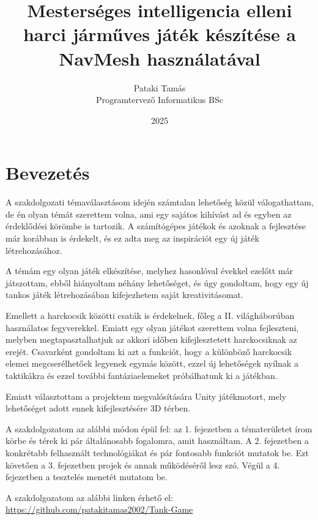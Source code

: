 \documentclass[
]{thesis-ekf}
\theoremstyle{definition}
\theoremstyle{remark}
\begin{document}
\title{Mesterséges intelligencia elleni harci járműves játék készítése a NavMesh használatával}
\author{Pataki Tamás\\Programtervező Informatikus BSc}
\date{2025}
\maketitle

\tableofcontents

\chapter*{Bevezetés}

A szakdolgozati témaválasztásom idején számtalan lehetőség közül válogathattam, de én olyan témát szerettem volna, ami egy sajátos kihívást ad és egyben az érdeklődési körömbe is tartozik. A számítógépes játékok és azoknak a fejlesztése már korábban is érdekelt, és ez adta meg az inspirációt egy új játék létrehozásához.

A témám egy olyan játék elkészítése, melyhez hasonlóval évekkel ezelőtt már játszottam, ebből hiányoltam néhány lehetőséget, és úgy gondoltam, hogy egy új tankos játék létrehozásában kifejezhetem saját kreativitásomat.

Emellett a harckocsik közötti csaták is érdekelnek, főleg a II. világháborúban használatos fegyverekkel. Emiatt egy olyan játékot szerettem volna fejleszteni, melyben megtapasztalhatjuk az akkori időben kifejlesztetett harckocsiknak az erejét. Csavarként gondoltam ki azt a funkciót, hogy a különböző harckocsik elemei megcserélhetőek legyenek egymás között, ezzel új lehetőségek nyílnak a taktikákra és ezzel további fantáziaelemeket próbálhatunk ki a játékban.

Emiatt választottam a projektem megvalósítására Unity\cite{unity} játékmotort, mely lehetőséget adott ennek kifejlesztésére 3D térben.

A szakdolgozatom az alábbi módon épül fel: az 1. fejezetben a tématerületet írom körbe és térek ki pár általánosabb fogalomra, amit használtam. A 2. fejezetben a konkrétabb felhasznált technológiákat és pár fontosabb funkciót mutatok be. Ezt követően a 3. fejezetben projek és annak működéséről lesz szó. Végül a 4. fejezetben a tesztelés menetét mutatom be.

A szakdolgozatom az alábbi linken érhető el: \url{https://github.com/patakitamas2002/Tank-Game}
\end{document}
